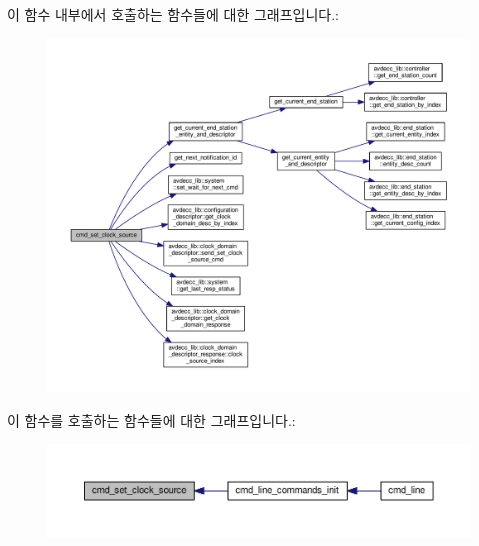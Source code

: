 이 함수 내부에서 호출하는 함수들에 대한 그래프입니다.\+:
\nopagebreak
\begin{figure}[H]
\begin{center}
\leavevmode
\includegraphics[width=350pt]{classcmd__line_a73d334537ebbccbe0807b12b0c8019ee_cgraph}
\end{center}
\end{figure}




이 함수를 호출하는 함수들에 대한 그래프입니다.\+:
\nopagebreak
\begin{figure}[H]
\begin{center}
\leavevmode
\includegraphics[width=350pt]{classcmd__line_a73d334537ebbccbe0807b12b0c8019ee_icgraph}
\end{center}
\end{figure}


